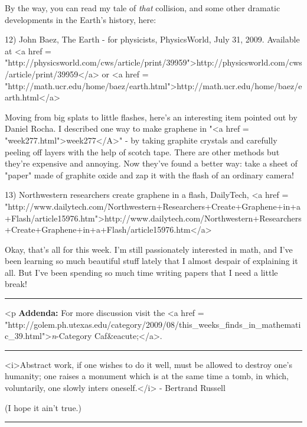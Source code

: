 By the way, you can read my tale of \emph{that} collision,
and some other dramatic developments in the Earth's history, here:

12) John Baez, The Earth - for physicists, PhysicsWorld, July 31, 2009.
Available at <a href = "http://physicsworld.com/cws/article/print/39959">http://physicsworld.com/cws/article/print/39959</a> or
<a href = "http://math.ucr.edu/home/baez/earth.html">http://math.ucr.edu/home/baez/earth.html</a>

Moving from big splats to little flashes, here's an interesting item
pointed out by Daniel Rocha.  I described one way to make graphene in
"<a href = "week277.html">week277</A>" - by taking graphite
crystals and carefully peeling off layers with the help of scotch
tape.  There are other methods but they're expensive and annoying.
Now they've found a better way: take a sheet of "paper" made
of graphite oxide and zap it with the flash of an ordinary camera!

13) Northwestern researchers create graphene in a flash, DailyTech,
<a href = "http://www.dailytech.com/Northwestern+Researchers+Create+Graphene+in+a+Flash/article15976.htm">http://www.dailytech.com/Northwestern+Researchers+Create+Graphene+in+a+Flash/article15976.htm</a>

Okay, that's all for this week.  I'm still passionately interested in
math, and I've been learning so much beautiful stuff lately that I
almost despair of explaining it all.  But I've been spending so much
time writing papers that I need a little break!  

\par\noindent\rule{\textwidth}{0.4pt}
<p
\textbf{Addenda:} For more discussion visit the <a href =
"http://golem.ph.utexas.edu/category/2009/08/this_weeks_finds_in_mathematic_39.html">\emph{n}-Category
Caf&eacute;</a>.

\par\noindent\rule{\textwidth}{0.4pt}
<i>Abstract work, if one wishes to do it well, must be allowed to destroy
one's humanity; one raises a monument which is at the same time a tomb, 
in which, voluntarily, one slowly inters oneself.</i> - Bertrand Russell

(I hope it ain't true.)

\par\noindent\rule{\textwidth}{0.4pt}

